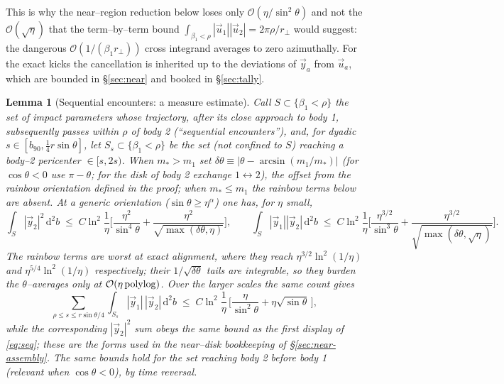 \documentclass[11pt]{article}
\newcommand{\dd}{\mathrm{d}}
\newcommand{\rp}{r_\perp}
\newcommand{\order}[1]{\mathcal O\!\left(#1\right)}
\newtheorem{lemma}{Lemma}
\begin{document}
This is why the near--region reduction below loses only $\order{\eta/\sin^2\theta}$ and not the
$\order{\sqrt\eta}$ that the term--by--term bound
$\int_{\beta_1<\rho}|\vec u_1||\vec u_2|=2\pi\rho/\rp$ would suggest: the dangerous
$\order{1/(\beta_1\rp)}$ cross integrand averages to zero azimuthally. For the exact kicks the
cancellation is inherited up to the deviations of $\vec y_a$ from $\vec u_a$, which are bounded in
\S\ref{sec:near} and booked in \S\ref{sec:tally}.

\begin{lemma}[Sequential encounters: a measure estimate]
\label{lem:seq}
Call $S\subset\{\beta_1<\rho\}$ the set of impact parameters whose trajectory, after its close
approach to body 1, subsequently passes within $\rho$ of body 2 (``sequential encounters''), and,
for dyadic $s\in[b_{90},\tfrac14 r\sin\theta]$, let $S_s\subset\{\beta_1<\rho\}$ be the set (not
confined to $S$) reaching a body--2 pericenter $\in[s,2s)$. When $m_*>m_1$ set $\delta\theta\equiv\big|\theta-\arcsin(m_1/m_*)\big|$
(for $\cos\theta<0$ use $\pi-\theta$; for the disk of body 2 exchange $1\leftrightarrow2$), the
offset from the \emph{rainbow} orientation defined in the proof; when $m_*\le m_1$ the rainbow
terms below are absent. At a generic orientation ($\sin\theta\ge\eta^\alpha$) one has, for $\eta$
small,
\begin{equation}
  \int_S|\vec y_2|^2\,\dd^2b\;\le\;C\ln^2\!\frac1\eta
  \bigg[\frac{\eta^2}{\sin^4\theta}+\frac{\eta^{2}}{\sqrt{\max(\delta\theta,\eta)}}\bigg],
  \qquad
  \int_S|\vec y_1||\vec y_2|\,\dd^2b\;\le\;C\ln^2\!\frac1\eta
  \bigg[\frac{\eta^{3/2}}{\sin^{3}\theta}+\frac{\eta^{3/2}}{\sqrt{\max(\delta\theta,\sqrt\eta)}}\bigg].
  \label{eq:seq}
\end{equation}
The rainbow terms are worst at exact alignment, where they reach $\eta^{3/2}\ln^2(1/\eta)$ and
$\eta^{5/4}\ln^2(1/\eta)$ respectively; their $1/\sqrt{\delta\theta}$ tails are integrable, so
they burden the $\theta$--averages only at $\order{\eta\,{\rm polylog}}$. Over the larger scales
the same count gives
\begin{equation}
  \sum_{\rho\le s\le r\sin\theta/4}\int_{S_s}|\vec y_1|\,|\vec y_2|\,\dd^2b
  \;\le\;C\ln^2\!\frac1\eta\,\Big[\frac{\eta}{\sin^2\theta}+\eta\sqrt{\sin\theta}\,\Big],
  \label{eq:seq-far}
\end{equation}
while the corresponding $|\vec y_2|^2$ sum obeys the same bound as the first display of
\eqref{eq:seq}; these are the forms used in the near--disk bookkeeping of
\S\ref{sec:near-assembly}. The same bounds hold for the set reaching body 2 \emph{before} body 1
(relevant when $\cos\theta<0$), by time reversal.
\end{lemma}
\end{document}
